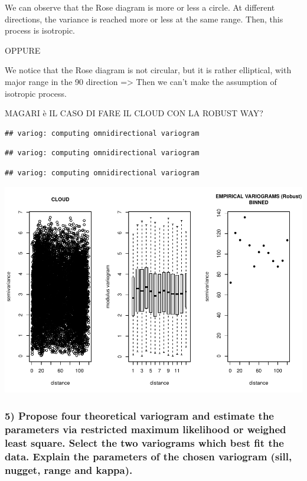 \documentclass[
]{article}
\begin{document}
We can observe that the Rose diagram is more or less a circle. At
different directions, the variance is reached more or less at the same
range. Then, this process is isotropic.

OPPURE

We notice that the Rose diagram is not circular, but it is rather
elliptical, with major range in the 90 direction =\textgreater{} Then we
can't make the assumption of isotropic process.

MAGARI è IL CASO DI FARE IL CLOUD CON LA ROBUST WAY?

\begin{verbatim}
## variog: computing omnidirectional variogram
\end{verbatim}

\begin{verbatim}
## variog: computing omnidirectional variogram
\end{verbatim}

\begin{verbatim}
## variog: computing omnidirectional variogram
\end{verbatim}

\includegraphics{Assignment_1_files/figure-latex/unnamed-chunk-24-1.pdf}

\hypertarget{propose-four-theoretical-variogram-and-estimate-the-parameters-via-restricted-maximum-likelihood-or-weighed-least-square.-select-the-two-variograms-which-best-fit-the-data.-explain-the-parameters-of-the-chosen-variogram-sill-nugget-range-and-kappa.}{%
\subsubsection{5) Propose four theoretical variogram and estimate the
parameters via restricted maximum likelihood or weighed least square.
Select the two variograms which best fit the data. Explain the
parameters of the chosen variogram (sill, nugget, range and
kappa).}\label{propose-four-theoretical-variogram-and-estimate-the-parameters-via-restricted-maximum-likelihood-or-weighed-least-square.-select-the-two-variograms-which-best-fit-the-data.-explain-the-parameters-of-the-chosen-variogram-sill-nugget-range-and-kappa.}}
\end{document}

